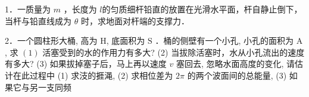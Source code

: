 
1．一质量为 $m$ ，长度为 $l$的匀质细杆铅直的放置在光滑水平面，杆自静止倒下，当杆与铅直线成为 $\theta$ 时，求地面对杆端的支撑力．

2．一个圆柱形大桶, 高为 $\mathrm{H}$, 底面积为 $\mathrm{S}$ ．桶的侧壁有一个小孔, 小孔的面积为 $\mathrm{A}$, 求 $(1)$ 活塞受到的水的作用力有多大? (2) 当拔除活塞时，水从小孔流出的速度有多大? (3) 如果拔掉塞子后，马上再以速度 $v$ 塞回去, 忽略水面高度的变化, 请估计在此过程中 (1) 求汥的捱渑, (2) 求相位差为 $2 \pi$ 的两个波面间的总能量, (3) 如果它与另一支同频
